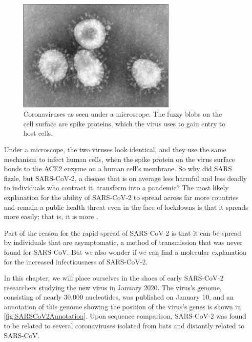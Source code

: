 \begin{figure}[h]
	\centering
	\mySfFamily
	\includegraphics[width = 0.7\textwidth]{../images/coronavirus.png}
	\caption{Coronaviruses as seen under a microscope. The fuzzy blobs on the cell surface are spike proteins, which the virus uses to gain entry to host cells.}
	\label{fig:coronavirus}
\end{figure}

Under a microscope, the two viruses look identical, and they use the same mechanism to infect human cells, when the spike protein on the virus surface bonds to the ACE2 enzyme on a human cell's membrane. So why did SARS fizzle, but SARS-CoV-2, a disease that is on average less harmful and less deadly to individuals who contract it, transform into a pandemic? The most likely explanation for the ability of SARS-CoV-2 to spread across far more countries and remain a public health threat even in the face of lockdowns is that it spreads more easily; that is, it is more .

Part of the reason for the rapid spread of SARS-CoV-2 is that it can be spread by individuals that are asymptomatic, a method of transmission that was never found for SARS-CoV. But we also wonder if we can find a molecular explanation for the increased infectiousness of SARS-CoV-2.

In this chapter, we will place ourselves in the shoes of early SARS-CoV-2 researchers studying the new virus in January 2020. The virus's genome, consisting of nearly 30,000 nucleotides, was published on January 10, and an annotation of this genome showing the position of the virus's genes is shown in \autoref{fig:SARSCoV2Annotation}. Upon sequence comparison, SARS-CoV-2 was found to be related to several coronaviruses isolated from bats and distantly related to SARS-CoV.\\

